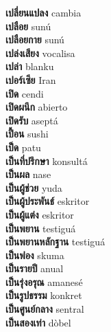 \textbf{ เปลี่ยนแปลง  } cambia \\
\textbf{ เปลือย  } sunú \\
\textbf{ เปลือยกาย  } sunú \\
\textbf{ เปล่งเสียง  } vocalisa \\
\textbf{ เปล่า  } blanku \\
\textbf{ เปอร์เซีย  } Iran \\
\textbf{ เปิด  } cendi \\
\textbf{ เปิดผนึก  } abierto \\
\textbf{ เปิดรับ  } aseptá \\
\textbf{ เปื้อน  } sushi \\
\textbf{ เป็ด  } patu \\
\textbf{ เป็นที่ปรึกษา  } konsultá \\
\textbf{ เป็นผล  } nase \\
\textbf{ เป็นผู้ช่วย  } yuda \\
\textbf{ เป็นผู้ประพันธ์  } eskritor \\
\textbf{ เป็นผู้แต่ง  } eskritor \\
\textbf{ เป็นพยาน  } testiguá \\
\textbf{ เป็นพยานหลักฐาน  } testiguá \\
\textbf{ เป็นฟอง  } skuma \\
\textbf{ เป็นรายปี  } anual \\
\textbf{ เป็นรุ่งอรุณ  } amanesé \\
\textbf{ เป็นรูปธรรม  } konkret \\
\textbf{ เป็นศูนย์กลาง  } sentral \\
\textbf{ เป็นสองเท่า  } dòbel \\
